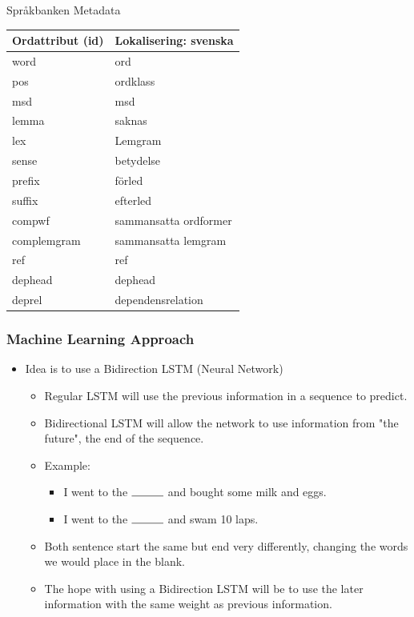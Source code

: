 \documentclass{beamer}
\begin{document}
\begin{frame}{Språkbanken Metadata}
    \begin{table}[]
\begin{tabular}{ll}
\hline
Ordattribut (id) & Lokalisering: svenska \\ \hline
word             & ord                   \\
pos              & ordklass              \\
msd              & msd                   \\
lemma            & saknas                \\
lex              & Lemgram               \\
sense            & betydelse             \\
prefix           & förled                \\
suffix           & efterled              \\
compwf           & sammansatta ordformer \\
complemgram      & sammansatta lemgram   \\
ref              & ref                   \\
dephead          & dephead               \\
deprel           & dependensrelation     \\ \hline
\end{tabular}
\end{table}
\end{frame}

\begin{frame}
\frametitle{Machine Learning Approach}
\begin{itemize}
\item Idea is to use a Bidirection LSTM (Neural Network)
    \begin{itemize}
        \item Regular LSTM will use the previous information in a sequence to predict.
        \item Bidirectional LSTM will allow the network to use information from "the future", the end of the sequence. \cite{coursera}
        \item Example: 
        \begin{itemize}
            \item I went to the $\rule{1cm}{0.15mm}$ and bought some milk and eggs.
            \item I went to the $\rule{1cm}{0.15mm}$ and swam 10 laps.
        \end{itemize} 
        \item Both sentence start the same but end very differently, changing the words we would place in the blank.
        \item The hope with using a Bidirection LSTM will be to use the later information with the same weight as previous information.
    \end{itemize}
\end{itemize}
\end{frame}
\end{document}
